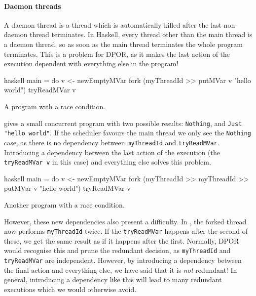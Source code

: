 \paragraph{Daemon threads}
A daemon thread is a thread which is automatically killed after the
last non-daemon thread terminates.  In Haskell, every thread other
than the main thread is a daemon thread, so as soon as the main thread
terminates the whole program terminates.  This is a problem for DPOR,
as it makes the last action of the execution dependent with everything
else in the program!

\begin{listing}
\centering
\begin{cminted}{haskell}
main = do
  v <- newEmptyMVar
  fork (myThreadId >> putMVar v "hello world")
  tryReadMVar v
\end{cminted}
\caption{A program with a race condition.}\label{lst:daemon1}
\end{listing}

 gives a small concurrent program with two possible
results: \verb|Nothing|, and \verb|Just "hello world"|.  If the
scheduler favours the main thread we only see the \verb|Nothing| case,
as there is no dependency between \verb|myThreadId| and
\verb|tryReadMVar|.  Introducing a dependency between the last action
of the execution (the \verb|tryReadMVar v| in this case) and
everything else solves this problem.

\begin{listing}
\centering
\begin{cminted}{haskell}
main = do
  v <- newEmptyMVar
  fork (myThreadId >> myThreadId >> putMVar v "hello world")
  tryReadMVar v
\end{cminted}
\caption{Another program with a race condition.}\label{lst:daemon2}
\end{listing}

However, these new dependencies also present a difficulty.  In
, the forked thread now performs \verb|myThreadId|
twice.  If the \verb|tryReadMVar| happens after the second of these,
we get the same result as if it happens after the first.  Normally,
DPOR would recognise this and prune the redundant decision, as
\verb|myThreadId| and \verb|tryReadMVar| are independent.  However, by
introducing a dependency between the final action and everything else,
we have said that it is \emph{not} redundant!  In general, introducing
a dependency like this will lead to many redundant executions which we
would otherwise avoid.

